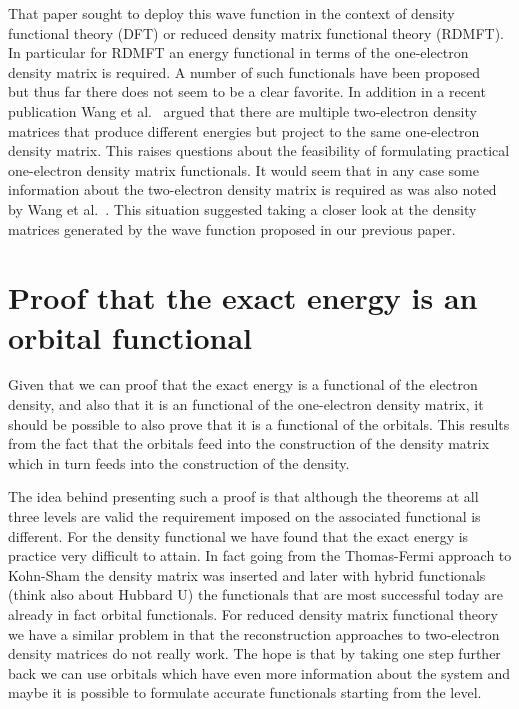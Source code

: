 \documentclass[pra]{revtex4-1}
\begin{document}
That paper sought to deploy this wave function
in the context of density functional theory (DFT) or reduced density matrix
functional theory (RDMFT). In particular for RDMFT an energy functional in
terms of the one-electron density matrix is required. A number of such 
functionals have been proposed~\cite{M_ller_1984,Goedecker_1998,Cs_nyi_2000,
BUIJSE_2002,Mazziotti_2001,Gritsenko_2005,Marques_2008,Piris_2012} but thus far
there does not seem to be a clear favorite. In addition in a recent publication
Wang et al.~\cite{Wang_2015} argued that there are multiple two-electron density
matrices that produce different energies but project to the same one-electron
density matrix. This raises questions about the feasibility of formulating
practical one-electron density matrix functionals. It would seem that in any
case some information about the two-electron density matrix is required as was
also noted by Wang et al.~\cite{Wang_2015}. This situation suggested taking a
closer look at the density matrices generated by the wave function proposed in
our previous paper. 

\section{Proof that the exact energy is an orbital functional}

Given that we can proof that the exact energy is a functional of the electron density,
and also that it is an functional of the one-electron density matrix, it should be
possible to also prove that it is a functional of the orbitals. This results from the
fact that the orbitals feed into the construction of the density matrix which in turn
feeds into the construction of the density. 

The idea behind presenting such a proof is that although the theorems at all three
levels are valid the requirement imposed on the associated functional is different.
For the density functional we have found that the exact energy is practice very 
difficult to attain. In fact going from the Thomas-Fermi approach to Kohn-Sham the 
density matrix was inserted and later with hybrid functionals (think also about Hubbard
U) the functionals that are most successful today are already in fact orbital
functionals. For reduced density matrix functional theory we have a similar problem in
that the reconstruction approaches to two-electron density matrices do not really work.
The hope is that by taking one step further back we can use orbitals which have even
more information about the system and maybe it is possible to formulate accurate 
functionals starting from the level.
\end{document}
